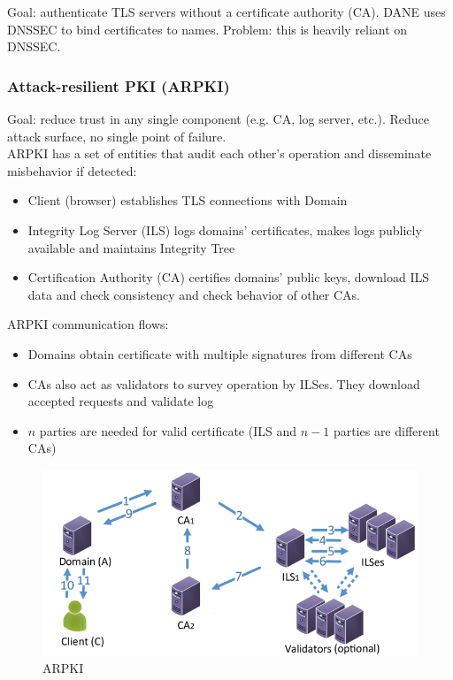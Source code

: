 \documentclass[11pt,oneside,a4paper]{article}
\begin{document}
Goal: authenticate TLS servers without a certificate authority (CA). DANE uses DNSSEC to bind certificates to names. Problem: this is heavily reliant on DNSSEC.

\subsubsection{Attack-resilient PKI (ARPKI)}

Goal: reduce trust in any single component (e.g. CA, log server, etc.). Reduce attack surface, no single point of failure.\\
ARPKI has a set of entities that audit each other's operation and disseminate misbehavior if detected:

\vspace{-\topsep}
\begin{itemize}
	\setlength{\itemsep}{0pt}
	\setlength{\parskip}{0pt}
	\item Client (browser) establishes TLS connections with	Domain
	\item Integrity Log Server (ILS) logs domains’ certificates, makes logs publicly available and maintains Integrity Tree
	\item Certification Authority (CA) certifies domains’ public keys, download ILS data and check consistency and check behavior of other CAs.
\end{itemize}
\vspace{-\topsep}

\noindent ARPKI communication flows:

\vspace{-\topsep}
\begin{itemize}
	\setlength{\itemsep}{0pt}
	\setlength{\parskip}{0pt}
	\item Domains obtain certificate with multiple signatures from different CAs
	\item CAs also act as validators to survey operation by ILSes. They download accepted requests and validate log
	\item $n$ parties are needed for valid certificate (ILS and $n-1$ parties are different CAs)
\end{itemize}
\vspace{-\topsep}

\begin{figure}[t!]
	\centering
	\includegraphics[width=0.5\linewidth]{figures/arpki}
	\caption{ARPKI}
	\label{fig:arpki}
\end{figure}
\end{document}
